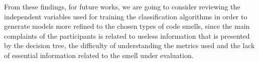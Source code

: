 From these findings, for future works, we are going to consider reviewing the independent variables used for training the classification algorithms in order to generate models more refined to the chosen types of code smells, since the main complaints of the participants is related to useless information that is presented by the decision tree, the difficulty of understanding the metrics used and the lack of essential information related to the smell under evaluation.